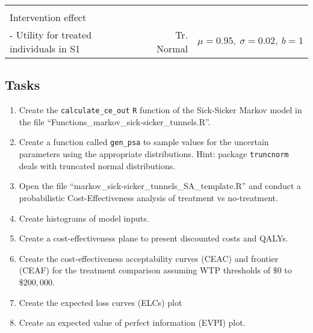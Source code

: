 \documentclass[
]{article}
\begin{document}
\begin{longtable}[]{@{}lrr@{}}
\begin{minipage}[t]{0.42\columnwidth}
\end{minipage}\tabularnewline
\begin{minipage}[t]{0.32\columnwidth}\raggedright
Intervention effect\strut
\end{minipage} & \begin{minipage}[t]{0.17\columnwidth}\raggedleft
\strut
\end{minipage} & \begin{minipage}[t]{0.42\columnwidth}\raggedleft
\strut
\end{minipage}\tabularnewline
\begin{minipage}[t]{0.32\columnwidth}\raggedright
- Utility for treated individuals in S1\strut
\end{minipage} & \begin{minipage}[t]{0.17\columnwidth}\raggedleft
Tr. Normal\strut
\end{minipage} & \begin{minipage}[t]{0.42\columnwidth}\raggedleft
\(\mu = 0.95, \ \sigma = 0.02, \ b = 1\)\strut
\end{minipage}\tabularnewline
\bottomrule
\end{longtable}

\hypertarget{tasks-1}{%
\subsection{Tasks}\label{tasks-1}}

\begin{enumerate}
\def\labelenumi{\arabic{enumi}.}
\setcounter{enumi}{4}
\item
  Create the \texttt{calculate\_ce\_out} \texttt{R} function of the
  Sick-Sicker Markov model in the file
  ``Functions\_markov\_sick-sicker\_tunnels.R''.
\item
  Create a function called \texttt{gen\_psa} to sample values for the
  uncertain parameters using the appropriate distributions. Hint:
  package \texttt{truncnorm} deals with truncated normal distributions.
\item
  Open the file ``markov\_sick-sicker\_tunnels\_SA\_template.R'' and
  conduct a probabilistic Cost-Effectiveness analysis of treatment vs
  no-treatment.
\item
  Create histograms of model inputs.
\item
  Create a cost-effectiveness plane to present discounted costs and
  QALYs.
\item
  Create the cost-effectiveness acceptability curves (CEAC) and frontier
  (CEAF) for the treatment comparison assuming WTP thresholds of \(\$0\)
  to \(\$200,000\).
\item
  Create the expected loss curves (ELCs) plot
\item
  Create an expected value of perfect information (EVPI) plot.
\end{enumerate}
\end{document}
